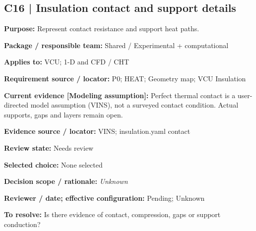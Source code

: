 \documentclass[11pt]{article}
\begin{document}
\par\noindent\begin{minipage}{\textwidth}\small\setlength{\parskip}{2pt}
\subsection*{C16 | Insulation contact and support details}
\textbf{Purpose:} Represent contact resistance and support heat paths.\par
\textbf{Package / responsible team:} Shared / Experimental + computational\par
\textbf{Applies to:} VCU; 1-D and CFD / CHT\par
\textbf{Requirement source / locator:} P0; HEAT; Geometry map; VCU Insulation\par
\textbf{Current evidence [Modeling assumption]:} Perfect thermal contact is a user-directed model assumption (VINS), not a surveyed contact condition. Actual supports, gaps and layers remain open.\par
\textbf{Evidence source / locator:} VINS; insulation.yaml contact\par
\textbf{Review state:} Needs review\par
\textbf{Selected choice:} None selected\par
\textbf{Decision scope / rationale:} \textit{Unknown}\par
\textbf{Reviewer / date; effective configuration:} Pending; Unknown\par
\textbf{To resolve:} Is there evidence of contact, compression, gaps or support conduction?\par
\end{minipage}\par\vspace{5pt}
\end{document}
